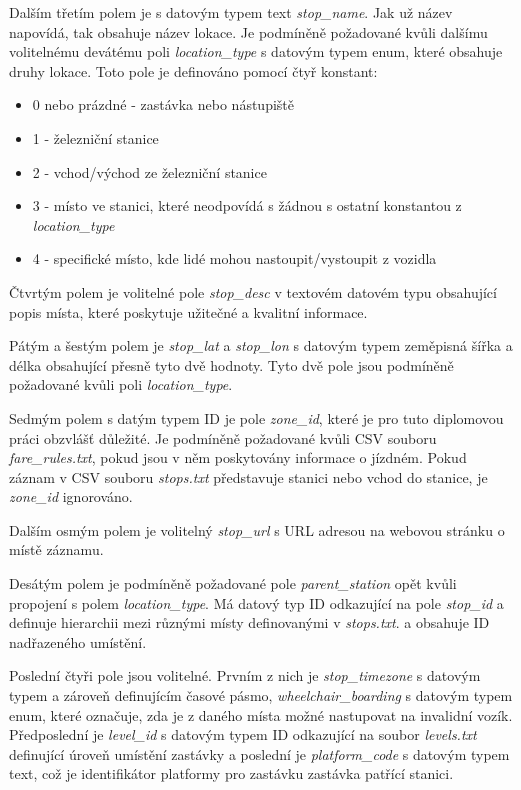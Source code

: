 Dalším třetím polem je s datovým typem text \textit{stop\_name}. Jak už název napovídá, tak obsahuje název lokace. 
Je podmíněně požadované kvůli dalšímu volitelnému devátému poli \textit{location\_type} s datovým typem enum, 
které obsahuje druhy lokace.
Toto pole je definováno pomocí čtyř konstant:
\begin{itemize} 
\item 0 nebo prázdné - zastávka nebo nástupiště
\item 1 - železniční stanice 
\item 2 - vchod/východ ze železniční stanice 
\item 3 - místo ve stanici, které neodpovídá s žádnou s ostatní konstantou z \textit{location\_type} 
\item 4 - specifické místo, kde lidé mohou nastoupit/vystoupit z vozidla
\end{itemize}

Čtvrtým polem je volitelné pole \textit{stop\_desc} v textovém datovém typu obsahující popis místa, 
které poskytuje užitečné a kvalitní informace.

Pátým a šestým polem je \textit{stop\_lat} a \textit{stop\_lon} s datovým typem zeměpisná šířka a délka
obsahující přesně tyto dvě hodnoty. Tyto dvě pole jsou podmíněně požadované kvůli poli \textit{location\_type}.

Sedmým polem s datým typem ID je pole \textit{zone\_id}, které je pro tuto diplomovou práci obzvlášť důležité.
Je podmíněně požadované kvůli CSV souboru \textit{fare\_rules.txt}, pokud jsou v něm poskytovány informace o jízdném.
Pokud záznam v CSV souboru \textit{stops.txt} představuje stanici nebo vchod do stanice, je \textit{zone\_id} ignorováno.

Dalším osmým polem je volitelný \textit{stop\_url} s URL adresou na webovou stránku o místě záznamu.

Desátým polem je podmíněně požadované pole \textit{parent\_station} opět kvůli propojení s polem \textit{location\_type}.
Má datový typ ID odkazující na pole \textit{stop\_id} a definuje hierarchii mezi různými místy definovanými v \textit{stops.txt}. 
a obsahuje ID nadřazeného umístění.

Poslední čtyři pole jsou volitelné. Prvním z nich je \textit{stop\_timezone} s datovým typem a zároveň definujícím časové
pásmo, \textit{wheelchair\_boarding} s datovým typem enum, které označuje, zda je z daného místa možné nastupovat na invalidní vozík.
Předposlední je \textit{level\_id} s datovým typem ID odkazující na soubor \textit{levels.txt} definující úroveň
umístění zastávky a poslední je \textit{platform\_code} s datovým typem text, 
což je identifikátor platformy pro zastávku zastávka patřící stanici.

